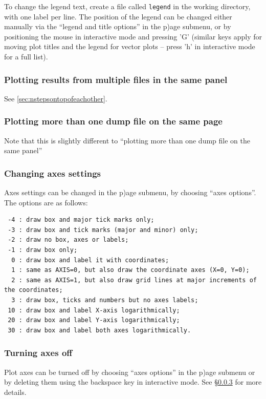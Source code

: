 \documentclass[a4paper,10pt]{article}
\begin{document}
To change the legend text, create a file called \verb+legend+ in the working directory, with one label per line. The position of the legend can be changed either manually via the ``legend and title options'' in the p)age submenu, or by positioning the mouse in interactive mode and pressing 'G' (similar keys apply for moving plot titles and the legend for vector plots -- press 'h' in interactive mode for a full list). 

\subsubsection{ Plotting results from multiple files in the same panel}
 See \ref{sec:nstepsontopofeachother}.

\subsubsection{ Plotting more than one dump file on the same page}
 Note that this is slightly different to ``plotting more than one dump file on the same panel''

\subsubsection{ Changing axes settings}
\label{sec:axessettings}
 Axes settings can be changed in the p)age submenu, by choosing ``axes options''. The options are as follows:
\begin{verbatim}
 -4 : draw box and major tick marks only;
 -3 : draw box and tick marks (major and minor) only;
 -2 : draw no box, axes or labels;
 -1 : draw box only;
  0 : draw box and label it with coordinates;
  1 : same as AXIS=0, but also draw the coordinate axes (X=0, Y=0);
  2 : same as AXIS=1, but also draw grid lines at major increments of the coordinates;
  3 : draw box, ticks and numbers but no axes labels;
 10 : draw box and label X-axis logarithmically;
 20 : draw box and label Y-axis logarithmically;
 30 : draw box and label both axes logarithmically.
\end{verbatim}

\subsubsection{ Turning axes off}
 Plot axes can be turned off by choosing ``axes options'' in the p)age submenu or by deleting them using the backspace key in interactive mode. See \S\ref{sec:axessettings} for more details. 
\end{document}
